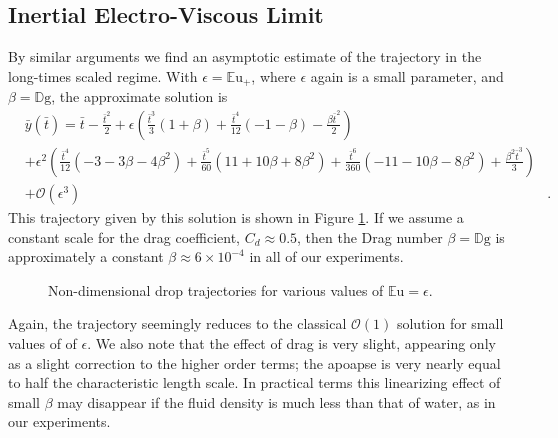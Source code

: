 \documentclass[12pt,a4paper,oneside]{book}
\begin{document}
\subsection{Inertial Electro-Viscous Limit}
By similar arguments we find an asymptotic estimate of the trajectory in the long-times scaled regime. With $\epsilon = {\mathbb{E}\mbox{u}}_+$, where $\epsilon$ again is a small parameter, and $\beta = \mathbb{D}\mbox{g}$, the approximate solution is 
\begin{eqnarray*}
&\bar{y}(\bar{t}) = \bar{t} - \frac{\bar{t}^{2}}{2} + \epsilon \left(\frac{\bar{t}^{3}}{3} \left(1 + \beta\right) + \frac{\bar{t}^{4}}{12} \left(-1 - \beta\right) - \frac{\beta \bar{t}^{2}}{2}\right)&  \\
&+ \epsilon^{2} \left(\frac{\bar{t}^{4}}{12} \left(-3 - 3 \beta - 4 \beta^{2}\right) + \frac{\bar{t}^{5}}{60} \left(11 + 10 \beta + 8 \beta^{2}\right)+ \frac{\bar{t}^{6}}{360} \left(-11 - 10 \beta - 8 \beta^{2}\right) + \frac{\beta^{2} \bar{t}^{3}}{3}\right)& \\
 &+ \mathcal{O}(\epsilon^3)&.
\end{eqnarray*}
This trajectory given by this solution is shown in Figure \ref{fig:long_times}. If we assume a constant scale for the drag coefficient, $C_d \approx 0.5$, then  the Drag number $\beta = \mathbb{D}\mbox{g}$ is approximately a constant $\beta \approx 6 \times 10^{-4}$ in all of our experiments.
\begin{figure}[htb]
    \centering
    
    \caption{Non-dimensional drop trajectories for various values of $\mathbb{E}\mbox{u}=\epsilon$.}
     \label{fig:long_times}
\end{figure}
Again, the trajectory seemingly reduces to the classical $\mathcal{O}(1)$ solution for small values of of $\epsilon$. We also note that the effect of drag is very slight, appearing only as a slight correction to the higher order terms; the apoapse is very nearly equal to half the characteristic length scale. In practical terms this linearizing effect of small $\beta$ may disappear if the fluid density is much less than that of water, as in our experiments.
 
\end{document}
